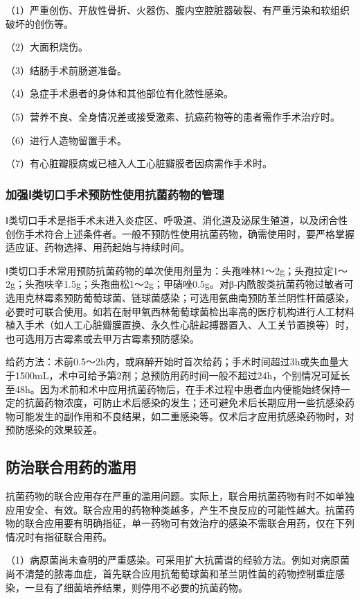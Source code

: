 （1）严重创伤、开放性骨折、火器伤、腹内空腔脏器破裂、有严重污染和软组织破坏的创伤等。

（2）大面积烧伤。

（3）结肠手术前肠道准备。

（4）急症手术患者的身体和其他部位有化脓性感染。

（5）营养不良、全身情况差或接受激素、抗癌药物等的患者需作手术治疗时。

（6）进行人造物留置手术。

（7）有心脏瓣膜病或已植入人工心脏瓣膜者因病需作手术时。

\subsubsection{加强Ⅰ类切口手术预防性使用抗菌药物的管理}

Ⅰ类切口手术是指手术未进入炎症区、呼吸道、消化道及泌尿生殖道，以及闭合性创伤手术符合上述条件者。一般不预防性使用抗菌药物，确需使用时，要严格掌握适应证、药物选择、用药起始与持续时间。

Ⅰ类切口手术常用预防抗菌药物的单次使用剂量为：头孢唑林1～2g；头孢拉定1～2g；头孢呋辛1.5g；头孢曲松1～2g；甲硝唑0.5g。对β-内酰胺类抗菌药物过敏者可选用克林霉素预防葡萄球菌、链球菌感染；可选用氨曲南预防革兰阴性杆菌感染，必要时可联合使用。如若在耐甲氧西林葡萄球菌检出率高的医疗机构进行人工材料植入手术（如人工心脏瓣膜置换、永久性心脏起搏器置入、人工关节置换等）时，也可选用万古霉素或去甲万古霉素预防感染。

给药方法：术前0.5～2h内，或麻醉开始时首次给药；手术时间超过3h或失血量大于1500mL，术中可给予第2剂；总预防用药时间一般不超过24h，个别情况可延长至48h。因为术前和术中应用抗菌药物后，在手术过程中患者血内便能始终保持一定的抗菌药物浓度，可防止术后感染的发生；还可避免术后长期应用一些抗感染药物可能发生的副作用和不良结果，如二重感染等。仅术后才应用抗感染药物时，对预防感染的效果较差。

\subsection{防治联合用药的滥用}

抗菌药物的联合应用存在严重的滥用问题。实际上，联合用抗菌药物有时不如单独应用安全、有效。联合应用的药物种类越多，产生不良反应的可能性越大。抗菌药物的联合应用要有明确指征，单一药物可有效治疗的感染不需联合用药，仅在下列情况时有指征联合用药。

（1）病原菌尚未查明的严重感染。可采用扩大抗菌谱的经验方法。例如对病原菌尚不清楚的脓毒血症，首先联合应用抗葡萄球菌和革兰阴性菌的药物控制重症感染，一旦有了细菌培养结果，则停用不必要的抗菌药物。


